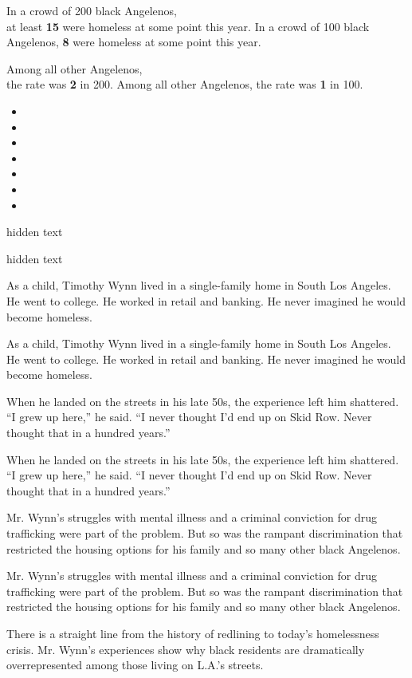 In a crowd of 200 black Angelenos,\\
at least \textbf{15} were homeless at some point this year. In a crowd
of 100 black Angelenos, \textbf{8} were homeless at some point this
year.

Among all other Angelenos,\\
the rate was \textbf{2} in 200. Among all other Angelenos, the rate was
\textbf{1} in 100.

\begin{itemize}
\item
\item
\item
\item
\item
\item
\item
\end{itemize}

 hidden text

 hidden text

 As a child, Timothy Wynn lived in a single-family home in South Los
Angeles. He went to college. He worked in retail and banking. He never
imagined he would become homeless.

 As a child, Timothy Wynn lived in a single-family home in South Los
Angeles. He went to college. He worked in retail and banking. He never
imagined he would become homeless.

 When he landed on the streets in his late 50s, the experience left him
shattered. ``I grew up here,'' he said. ``I never thought I'd end up on
Skid Row. Never thought that in a hundred years.''

 When he landed on the streets in his late 50s, the experience left him
shattered. ``I grew up here,'' he said. ``I never thought I'd end up on
Skid Row. Never thought that in a hundred years.''

 Mr. Wynn's struggles with mental illness and a criminal conviction for
drug trafficking were part of the problem. But so was the rampant
discrimination that restricted the housing options for his family and so
many other black Angelenos.

 Mr. Wynn's struggles with mental illness and a criminal conviction for
drug trafficking were part of the problem. But so was the rampant
discrimination that restricted the housing options for his family and so
many other black Angelenos.

 There is a straight line from the history of redlining to today's
homelessness crisis. Mr. Wynn's experiences show why black residents are
dramatically overrepresented among those living on L.A.'s streets.

